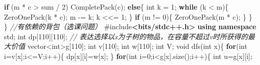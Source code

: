 \documentclass[
]{article}
\newenvironment{Shaded}{}{}
\newcommand{\CommentTok}[1]{\textcolor[rgb]{0.38,0.63,0.69}{\textit{#1}}}
\newcommand{\ControlFlowTok}[1]{\textcolor[rgb]{0.00,0.44,0.13}{\textbf{#1}}}
\newcommand{\DataTypeTok}[1]{\textcolor[rgb]{0.56,0.13,0.00}{#1}}
\newcommand{\DecValTok}[1]{\textcolor[rgb]{0.25,0.63,0.44}{#1}}
\newcommand{\ImportTok}[1]{\textcolor[rgb]{0.00,0.50,0.00}{\textbf{#1}}}
\newcommand{\KeywordTok}[1]{\textcolor[rgb]{0.00,0.44,0.13}{\textbf{#1}}}
\newcommand{\NormalTok}[1]{#1}
\newcommand{\OperatorTok}[1]{\textcolor[rgb]{0.40,0.40,0.40}{#1}}
\newcommand{\PreprocessorTok}[1]{\textcolor[rgb]{0.74,0.48,0.00}{#1}}
\begin{document}
\begin{Shaded}
\begin{Highlighting}[]
    \ControlFlowTok{if} \OperatorTok{(}\NormalTok{m }\OperatorTok{*}\NormalTok{ c }\OperatorTok{\textgreater{}}\NormalTok{ sum }\OperatorTok{/} \DecValTok{2}\OperatorTok{)}
\NormalTok{        CompletePack}\OperatorTok{(}\NormalTok{c}\OperatorTok{);}
    \ControlFlowTok{else}\OperatorTok{\{}
        \DataTypeTok{int}\NormalTok{ k }\OperatorTok{=} \DecValTok{1}\OperatorTok{;}
        \ControlFlowTok{while} \OperatorTok{(}\NormalTok{k }\OperatorTok{\textless{}}\NormalTok{ m}\OperatorTok{)\{}
\NormalTok{            ZeroOnePack}\OperatorTok{(}\NormalTok{k }\OperatorTok{*}\NormalTok{ c}\OperatorTok{);}
\NormalTok{            m }\OperatorTok{{-}=}\NormalTok{ k}\OperatorTok{;}
\NormalTok{            k }\OperatorTok{\textless{}\textless{}=} \DecValTok{1}\OperatorTok{;}
        \OperatorTok{\}}
        \ControlFlowTok{if} \OperatorTok{(}\NormalTok{m }\OperatorTok{!=} \DecValTok{0}\OperatorTok{)\{}
\NormalTok{            ZeroOnePack}\OperatorTok{(}\NormalTok{m }\OperatorTok{*}\NormalTok{ c}\OperatorTok{);}
        \OperatorTok{\}}
    \OperatorTok{\}}
\OperatorTok{\}}
\CommentTok{//有依赖的背包（选课问题）}
\PreprocessorTok{\#include}\ImportTok{\textless{}bits/stdc++.h\textgreater{}}
\KeywordTok{using} \KeywordTok{namespace}\NormalTok{ std}\OperatorTok{;}
\DataTypeTok{int}\NormalTok{ dp}\OperatorTok{[}\DecValTok{110}\OperatorTok{][}\DecValTok{110}\OperatorTok{];} \CommentTok{// 表达选择以x为子树的物品，在容量不超过v时所获得的最大价值}
\NormalTok{vector}\OperatorTok{\textless{}}\DataTypeTok{int}\OperatorTok{\textgreater{}}\NormalTok{g}\OperatorTok{[}\DecValTok{110}\OperatorTok{];}
\DataTypeTok{int}\NormalTok{ v}\OperatorTok{[}\DecValTok{110}\OperatorTok{];}
\DataTypeTok{int}\NormalTok{ w}\OperatorTok{[}\DecValTok{110}\OperatorTok{];}
\DataTypeTok{int}\NormalTok{ V}\OperatorTok{;}
\DataTypeTok{void}\NormalTok{ dfs}\OperatorTok{(}\DataTypeTok{int}\NormalTok{ x}\OperatorTok{)\{}
	\ControlFlowTok{for}\OperatorTok{(}\DataTypeTok{int}\NormalTok{ i}\OperatorTok{=}\NormalTok{v}\OperatorTok{[}\NormalTok{x}\OperatorTok{];}\NormalTok{i}\OperatorTok{\textless{}=}\NormalTok{V}\OperatorTok{;}\NormalTok{i}\OperatorTok{++)\{}
\NormalTok{		dp}\OperatorTok{[}\NormalTok{x}\OperatorTok{][}\NormalTok{i}\OperatorTok{]=}\NormalTok{w}\OperatorTok{[}\NormalTok{x}\OperatorTok{];}
	\OperatorTok{\}}
	\ControlFlowTok{for}\OperatorTok{(}\DataTypeTok{int}\NormalTok{ i}\OperatorTok{=}\DecValTok{0}\OperatorTok{;}\NormalTok{i}\OperatorTok{\textless{}}\NormalTok{g}\OperatorTok{[}\NormalTok{x}\OperatorTok{].}\NormalTok{size}\OperatorTok{();}\NormalTok{i}\OperatorTok{++)\{}
		\DataTypeTok{int}\NormalTok{ u}\OperatorTok{=}\NormalTok{g}\OperatorTok{[}\NormalTok{x}\OperatorTok{][}\NormalTok{i}\OperatorTok{];}

\end{Highlighting}
\end{Shaded}
\end{document}
